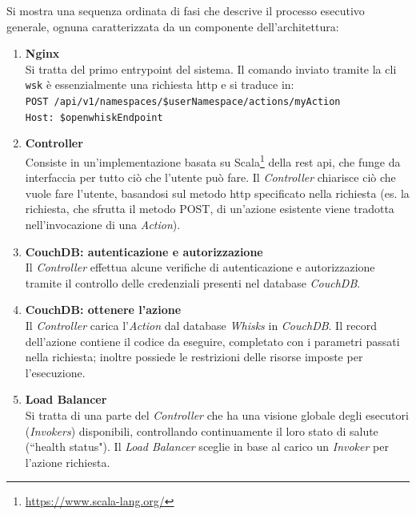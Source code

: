 \documentclass[12pt,a4paper,openany,twoside]{book}
\begin{document}
Si mostra una sequenza ordinata di fasi che descrive il processo esecutivo generale, ognuna caratterizzata da un componente dell'architettura:
\begin{enumerate}
    \item \textbf{Nginx} \\
    Si tratta del primo entrypoint del sistema.
    Il comando inviato tramite la \ac{cli} \texttt{wsk} è essenzialmente una richiesta \ac{http} e si traduce in:
    \\
    \texttt{POST /api/v1/namespaces/\$userNamespace/actions/myAction \\Host: \$openwhiskEndpoint}
    
    \item \textbf{Controller} \\
    Consiste in un'implementazione basata su Scala\footnote{\url{https://www.scala-lang.org/}} della \ac{rest} \ac{api}, che funge da interfaccia per tutto ciò che l'utente può fare. Il \textit{Controller} chiarisce ciò che vuole fare l'utente, basandosi sul metodo \ac{http} specificato nella richiesta (es. la richiesta, che sfrutta il metodo POST, di un'azione esistente viene tradotta nell'invocazione di una \textit{Action}).
    
    \item \textbf{CouchDB: autenticazione e autorizzazione} \\
    Il \textit{Controller} effettua alcune verifiche di autenticazione e autorizzazione tramite il controllo delle credenziali presenti nel database \textit{CouchDB}.
    
    \item \textbf{CouchDB: ottenere l'azione} \\
    Il \textit{Controller} carica l'\textit{Action} dal database \textit{Whisks} in \textit{CouchDB}. Il record dell'azione contiene il codice da eseguire, completato con i parametri passati nella richiesta; inoltre possiede le restrizioni delle risorse imposte per l'esecuzione.
    
    \item \textbf{Load Balancer} \\
    Si tratta di una parte del \textit{Controller} che ha una visione globale degli esecutori (\textit{Invokers}) disponibili, controllando continuamente il loro stato di salute (``health status"). Il \textit{Load Balancer} sceglie in base al carico un \textit{Invoker} per l'azione richiesta.
    

\end{enumerate}
\end{document}
